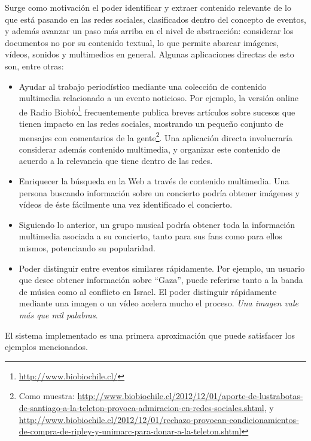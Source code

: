 \documentclass[upright, contnum]{umemoria}
\begin{document}
   Surge como motivación el poder identificar y extraer contenido
   relevante de lo que está pasando en las redes sociales,
   clasificados dentro del concepto de eventos, y además avanzar un
   paso más arriba en el nivel de abstracción: considerar los
   documentos no por su contenido textual, lo que permite abarcar
   imágenes, vídeos, sonidos y multimedios en general. Algunas
   aplicaciones directas de esto son, entre otras:

\begin{itemize}
\item Ayudar al trabajo periodístico mediante una colección de
     contenido multimedia relacionado a un evento noticioso. Por
     ejemplo, la versión online de Radio
     Biobío\footnote{\href{http://www.biobiochile.cl/}{http://www.biobiochile.cl/} } frecuentemente publica
     breves artículos sobre sucesos que tienen impacto en las redes
     sociales, mostrando un pequeño conjunto de mensajes con
     comentarios de la gente\footnote{Como muestra: \href{http://www.biobiochile.cl/2012/12/01/aporte-de-lustrabotas-de-santiago-a-la-teleton-provoca-admiracion-en-redes-sociales.shtml}{http://www.biobiochile.cl/2012/12/01/aporte-de-lustrabotas-de-santiago-a-la-teleton-provoca-admiracion-en-redes-sociales.shtml}, y \href{http://www.biobiochile.cl/2012/12/01/rechazo-provocan-condicionamientos-de-compra-de-ripley-y-unimarc-para-donar-a-la-teleton.shtml}{http://www.biobiochile.cl/2012/12/01/rechazo-provocan-condicionamientos-de-compra-de-ripley-y-unimarc-para-donar-a-la-teleton.shtml} }. 
     Una aplicación directa involucraría
     considerar además contenido multimedia, y organizar este
     contenido de acuerdo a la relevancia que tiene dentro de las
     redes.
\item Enriquecer la búsqueda en la Web a través de contenido
     multimedia. Una persona buscando información sobre un concierto
     podría obtener imágenes y vídeos de éste fácilmente una vez
     identificado el concierto.
\item Siguiendo lo anterior, un grupo musical podría obtener toda la
     información multimedia asociada a su concierto, tanto para sus
     fans como para ellos mismos, potenciando su popularidad.
\item Poder distinguir entre eventos similares rápidamente. Por
     ejemplo, un usuario que desee obtener información sobre ``Gaza'',
     puede referirse tanto a la banda de música como al conflicto en
     Israel. El poder distinguir rápidamente mediante una imagen o un
     vídeo acelera mucho el proceso. \emph{Una imagen vale más que mil palabras}.
\end{itemize}
   El sistema implementado es una primera aproximación que puede
   satisfacer los ejemplos mencionados.
\end{document}
